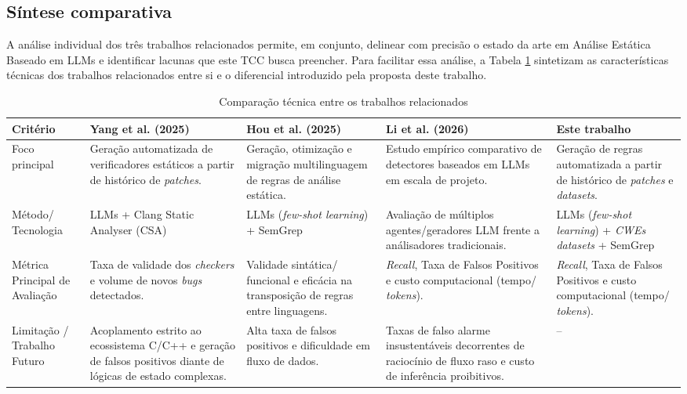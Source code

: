 \documentclass[
    12pt,                %
    openright,           %
    oneside,             %
    a4paper,             %
    english,             %
    brazil               %
]{abntex2}
\begin{document}
\subsection{Síntese comparativa}
\par
A análise individual dos três trabalhos relacionados permite, em conjunto, delinear com precisão o estado da arte em Análise Estática Baseado em LLMs e identificar lacunas que este TCC busca preencher.
Para facilitar essa análise, a Tabela \ref{tab:trabalhosrelacionados} sintetizam as características técnicas dos trabalhos relacionados entre si e o diferencial introduzido pela proposta deste trabalho.

\begin{table}[htb]
    \centering
    \caption{Comparação técnica entre os trabalhos relacionados}
    \label{tab:trabalhosrelacionados}
    \begin{tabular}{p{2cm}|p{3cm}|p{3cm}|p{3cm}|p{3cm}}
        \toprule
        \textbf{Critério} 
        & \textbf{Yang et al. (2025)} 
        & \textbf{Hou et al. (2025)} 
        & \textbf{Li et al. (2026)}
        & \textbf{Este trabalho} \\
        \midrule
        Foco principal
        & Geração automatizada de verificadores estáticos a partir de histórico de \textit{patches}.
        & Geração, otimização e migração multilinguagem de regras de análise estática.
        & Estudo empírico comparativo de detectores baseados em LLMs em escala de projeto.
        & Geração de regras automatizada a partir de histórico de \textit{patches} e \textit{datasets}. \\
        \midrule
        Método/ Tecnologia           
        & LLMs + Clang Static Analyser (CSA) 
        & LLMs (\textit{few-shot learning}) + SemGrep
        & Avaliação de múltiplos agentes/geradores LLM frente a análisadores tradicionais.   
        & LLMs (\textit{few-shot learning}) + \textit{CWEs datasets} + SemGrep \\
        \midrule
        Métrica Principal de Avaliação
        & Taxa de validade dos \textit{checkers} e volume de novos \textit{bugs} detectados.
        & Validade sintática/ funcional e eficácia na transposição de regras entre linguagens.
        & \textit{Recall}, Taxa de Falsos Positivos e custo computacional (tempo/ \textit{tokens}).
        & \textit{Recall}, Taxa de Falsos Positivos e custo computacional (tempo/ \textit{tokens}). \\
        \midrule
        Limitação / Trabalho Futuro
        & Acoplamento estrito ao ecossistema C/C++ e geração de falsos positivos diante de lógicas de estado complexas.
        & Alta taxa de falsos positivos e dificuldade em fluxo de dados.
        & Taxas de falso alarme insustentáveis decorrentes de raciocínio de fluxo raso e custo de inferência proibitivos. 
        & -- \\
        \bottomrule
    \end{tabular}
\end{table}
\end{document}
